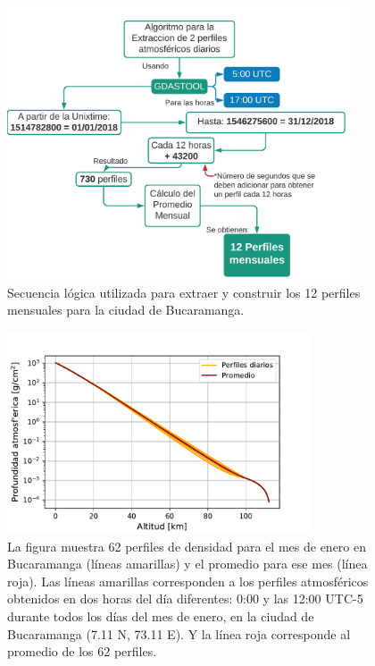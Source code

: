 \begin{figure}[htb!]
\centering
\includegraphics[width=0.9\textwidth]{Figs/Algoritmo_mensuales.pdf}
\caption[Secuencia lógica para obtener los perfiles mensuales usando GDASTOOL.]{Secuencia lógica utilizada para extraer y construir los 12 perfiles mensuales para la ciudad de Bucaramanga.}
 \label{fig:fig14}
 \end{figure}
\begin{figure}[htb!]
\centering
\includegraphics[width=0.8\textwidth]{Figs/promedio_enero2.pdf}
\caption[Promedio de la densidad atmosférica para la ciudad de Bucaramanga en enero.]{La figura muestra 62 perfiles de densidad para el mes de enero en Bucaramanga (líneas amarillas) y el promedio para ese mes (línea roja). Las líneas amarillas corresponden a los perfiles atmosféricos obtenidos en dos horas del día diferentes: 0:00 y las 12:00 UTC-5 durante todos los días del mes de enero, en la ciudad de Bucaramanga (7.11 N, 73.11 E). Y la línea roja corresponde al promedio de los 62 perfiles.}
\label{fig:fig15}
\end{figure}

